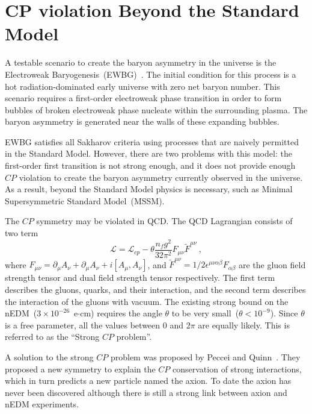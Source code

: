 \section{CP violation Beyond the Standard Model}
A testable scenario to create the baryon asymmetry in the universe is
the Electroweak Baryogenesis~(EWBG)~\cite{Morrissey2012}. The initial
condition for this process is a hot radiation-dominated early universe
with zero net baryon number. This scenario requires a first-order
electroweak phase transition in order to form bubbles of broken
electroweak phase nucleate within the surrounding plasma. The baryon
asymmetry is generated near the walls of these expanding bubbles.

EWBG satisfies all Sakharov criteria using processes that are naively
permitted in the Standard Model. However, there are two problems with
this model: the first-order first transition is not strong enough, and
it does not provide enough $CP$ violation to create the baryon
asymmetry currently observed in the universe. As a result, beyond the
Standard Model physics is necessary, such as Minimal Supersymmetric
Standard Model~(MSSM).

The $CP$ symmetry may be violated in QCD. The QCD Lagrangian consists
of two term
\begin{equation}
  \label{eqn:qcd}
\mathscr{L}= \mathscr{L}_{cp} - \theta \frac{n_f g^2}{32 \pi^2} F_{\mu \nu} \tilde{F}^{\mu \nu}~,
\end{equation}
where
$F_{\mu \nu} = \partial_\mu A_\nu + \partial_\mu A_\nu +
i[A_\mu,A_\nu]$, and
$\tilde{F}^{\mu \nu}=1/2 \epsilon^{\mu \nu \alpha \beta}F_{\alpha
  \beta}$ are the gluon field strength tensor and dual field strength
tensor respectively. The first term describes the gluons, quarks, and
their interaction, and the second term describes the interaction of
the gluons with vacuum. The existing strong bound on the
nEDM~($3 \times 10^{-26}$~e$\cdot$cm) requires the angle $\theta$ to
be very small~($\theta < 10^{-9}$). Since $\theta$ is a free
parameter, all the values between 0 and $2\pi$ are equally
likely. This is referred to as the ``Strong $CP$ problem''.

A solution to the strong $CP$ problem was proposed by Peccei and
Quinn~\cite{Peccei1977}. They proposed a new symmetry to explain the
$CP$ conservation of strong interactions, which in turn predicts a new
particle named the axion. To date the axion has never been discovered
although there is still a strong link between axion and nEDM
experiments.

